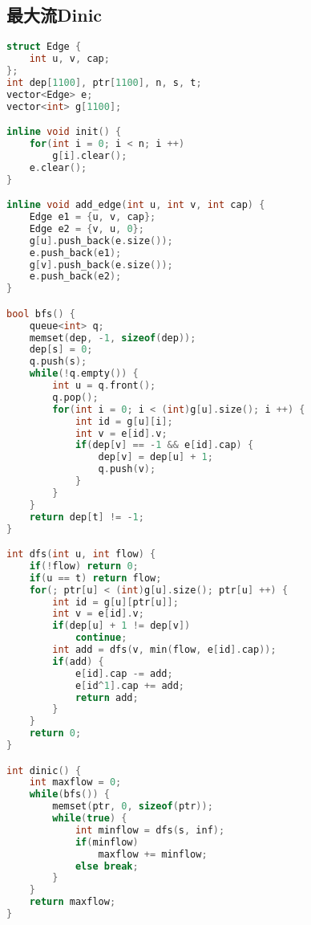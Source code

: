 \subsection{最大流Dinic}
    \begin{lstlisting}[language=c++]
struct Edge {
    int u, v, cap;
};
int dep[1100], ptr[1100], n, s, t;
vector<Edge> e;
vector<int> g[1100];

inline void init() {
    for(int i = 0; i < n; i ++)
        g[i].clear();
    e.clear();
}

inline void add_edge(int u, int v, int cap) {
    Edge e1 = {u, v, cap};
    Edge e2 = {v, u, 0};
    g[u].push_back(e.size());
    e.push_back(e1);
    g[v].push_back(e.size());
    e.push_back(e2);
}

bool bfs() {
    queue<int> q;
    memset(dep, -1, sizeof(dep));
    dep[s] = 0;
    q.push(s);
    while(!q.empty()) {
        int u = q.front();
        q.pop();
        for(int i = 0; i < (int)g[u].size(); i ++) {
            int id = g[u][i];
            int v = e[id].v;
            if(dep[v] == -1 && e[id].cap) {
                dep[v] = dep[u] + 1;
                q.push(v);
            }
        }
    }
    return dep[t] != -1;
}

int dfs(int u, int flow) {
    if(!flow) return 0;
    if(u == t) return flow;
    for(; ptr[u] < (int)g[u].size(); ptr[u] ++) {
        int id = g[u][ptr[u]];
        int v = e[id].v;
        if(dep[u] + 1 != dep[v])
            continue;
        int add = dfs(v, min(flow, e[id].cap));
        if(add) {
            e[id].cap -= add;
            e[id^1].cap += add;
            return add;
        }
    }
    return 0;
}

int dinic() {
    int maxflow = 0;
    while(bfs()) {
        memset(ptr, 0, sizeof(ptr));
        while(true) {
            int minflow = dfs(s, inf);
            if(minflow)
                maxflow += minflow;
            else break;
        }
    }
    return maxflow;
}
    \end{lstlisting}
